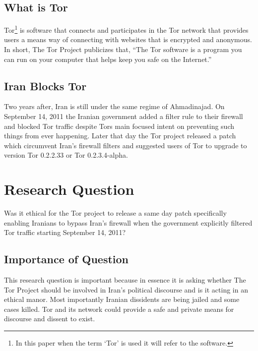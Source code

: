 \documentclass[11pt]{article}
\begin{document}
\begin{multicols}{2}
\subsection{What is Tor}

Tor\footnote{In this paper when the term `Tor' is used it will refer to the
software.} is software that connects and participates in the Tor network that
provides users a means way of connecting with websites that is encrypted and
anonymous. In short, The Tor Project publicizes that, ``The Tor software is a
program you can run on your computer that helps keep you safe on the
Internet.''\cite{Tor:FAQ} 

\subsection{Iran Blocks Tor}

Two years after, Iran is still under the same regime of Ahmadinajad.  On
September 14, 2011 the Iranian government added a filter rule to their firewall
and blocked Tor traffic despite Tors main focused intent on preventing such
things from ever happening. \cite{IranBlocksTorSameDayFix}  Later that day the
Tor project released a patch which circumvent Iran's firewall filters and
suggested users of Tor to upgrade to version Tor 0.2.2.33 or Tor
0.2.3.4-alpha.\cite{IranBlocksTorSameDayFix}

\section{Research Question} 
Was it ethical for the Tor project to release a same day patch specifically
enabling Iranians to bypass Iran's firewall when the government explicitly
filtered Tor traffic starting September 14, 2011?

\subsection{Importance of Question}

This research question is important because in essence it is asking whether The
Tor Project should be involved in Iran's political discourse and is it acting in
an ethical manor. Most importantly Iranian dissidents are being jailed and some
cases killed.\cite{IranBloggersDeath} Tor and its network could provide a safe
and private means for discourse and dissent to exist.



\end{multicols}
\end{document}
